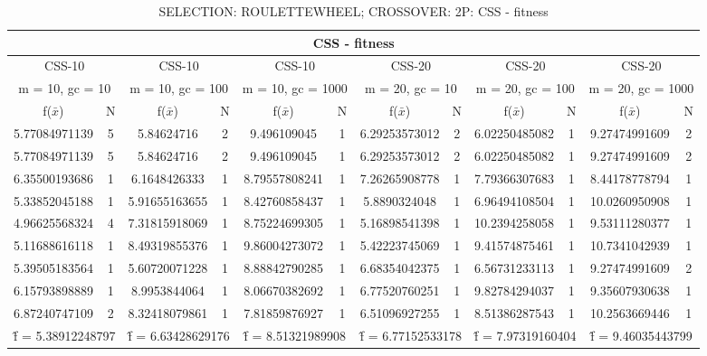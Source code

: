 \begin{table}[H]
	\centering
	\caption{SELECTION: ROULETTEWHEEL; CROSSOVER: 2P: CSS - fitness}
	\begin{adjustbox}{width=1\textwidth}
		\begin{tabular}{ |c|c||c|c||c|c||c|c||c|c||c|c| }
			\hline
			\multicolumn{12}{|c|}{CSS - fitness} \\
			\hline
			\multicolumn{2}{|c||}{CSS-10} & \multicolumn{2}{c||}{CSS-10} & \multicolumn{2}{c||}{CSS-10} & \multicolumn{2}{c||}{CSS-20} & \multicolumn{2}{c||}{CSS-20} & \multicolumn{2}{c|}{CSS-20}\\
			\hline
			\multicolumn{2}{|c||}{m = 10, gc = 10} & \multicolumn{2}{c||}{m = 10, gc = 100} & \multicolumn{2}{c||}{m = 10, gc = 1000} & \multicolumn{2}{c||}{m = 20, gc = 10} & \multicolumn{2}{c||}{m = 20, gc = 100} & \multicolumn{2}{c|}{m = 20, gc = 1000}\\
			\hline
			f($\bar{x}$) & N & f($\bar{x}$) & N & f($\bar{x}$) & N & f($\bar{x}$) & N & f($\bar{x}$) & N & f($\bar{x}$) & N\\
			\hline
			\hline
			5.77084971139 & 5 & 5.84624716 & 2 & 9.496109045 & 1 & 6.29253573012 & 2 & 6.02250485082 & 1 & 9.27474991609 & 2\\
			\hline
			5.77084971139 & 5 & 5.84624716 & 2 & 9.496109045 & 1 & 6.29253573012 & 2 & 6.02250485082 & 1 & 9.27474991609 & 2\\
			6.35500193686 & 1 & 6.1648426333 & 1 & 8.79557808241 & 1 & 7.26265908778 & 1 & 7.79366307683 & 1 & 8.44178778794 & 1\\
			5.33852045188 & 1 & 5.91655163655 & 1 & 8.42760858437 & 1 & 5.8890324048 & 1 & 6.96494108504 & 1 & 10.0260950908 & 1\\
			4.96625568324 & 4 & 7.31815918069 & 1 & 8.75224699305 & 1 & 5.16898541398 & 1 & 10.2394258058 & 1 & 9.53111280377 & 1\\
			5.11688616118 & 1 & 8.49319855376 & 1 & 9.86004273072 & 1 & 5.42223745069 & 1 & 9.41574875461 & 1 & 10.7341042939 & 1\\
			5.39505183564 & 1 & 5.60720071228 & 1 & 8.88842790285 & 1 & 6.68354042375 & 1 & 6.56731233113 & 1 & 9.27474991609 & 2\\
			6.15793898889 & 1 & 8.9953844064 & 1 & 8.06670382692 & 1 & 6.77520760251 & 1 & 9.82784294037 & 1 & 9.35607930638 & 1\\
			6.87240747109 & 2 & 8.32418079861 & 1 & 7.81859876927 & 1 & 6.51096927255 & 1 & 8.51386287543 & 1 & 10.2563669446 & 1\\
			\hline
			\multicolumn{2}{|c||}{\^{f} = 5.38912248797} & \multicolumn{2}{c||}{\^{f} = 6.63428629176} & \multicolumn{2}{c||}{\^{f} = 8.51321989908} & \multicolumn{2}{c||}{\^{f} = 6.77152533178} & \multicolumn{2}{c||}{\^{f} = 7.97319160404} & \multicolumn{2}{c|}{\^{f} = 9.46035443799}\\
			\hline
		\end{tabular}
	\end{adjustbox}
\end{table}
